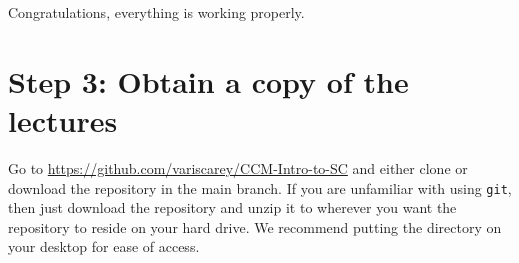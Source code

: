 \documentclass{amsart}
\theoremstyle{plain}
\theoremstyle{definition}
\theoremstyle{remark}
\theoremstyle{definition}
\numberwithin{equation}{section}
\numberwithin{equation}{section}
\begin{document}
Congratulations, everything is working properly. 

\section*{Step 3: Obtain a copy of the lectures}

Go to \href{https://github.com/variscarey/CCM-Intro-to-SC}{https://github.com/variscarey/CCM-Intro-to-SC} and either clone or download the repository in the main branch.
If you are unfamiliar with using \verb|git|, then just download the repository and unzip it to wherever you want the repository to reside on your hard drive. 
We recommend putting the directory on your desktop for ease of access. 
\end{document}
